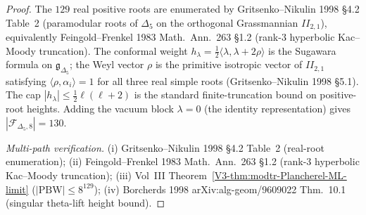 \begin{proof}
The $129$ real positive roots are enumerated by
Gritsenko--Nikulin 1998 \S 4.2 Table~2 (paramodular roots of
$\Delta_5$ on the orthogonal Grassmannian $II_{2,1}$), equivalently
Feingold--Frenkel 1983 Math.~Ann.~263 \S 1.2
(rank-$3$ hyperbolic Kac--Moody truncation). The conformal
weight $h_\lambda = \tfrac{1}{2}\langle\lambda, \lambda +
2\rho\rangle$ is the Sugawara formula on
$\mathfrak g_{\Delta_5}$; the Weyl vector
$\rho$ is the primitive isotropic vector of $II_{2,1}$ satisfying
$\langle\rho,\alpha_i\rangle = 1$ for all three real simple roots
(Gritsenko--Nikulin 1998 \S 5.1). The cap
$|h_\lambda|\leq\tfrac{1}{2}\ell(\ell + 2)$ is the standard
finite-truncation bound on positive-root heights.
Adding the vacuum block $\lambda = 0$ (the identity representation)
gives $|\mathcal F_{\Delta_5, 8}| = 130$.

\emph{Multi-path verification.}
(i) Gritsenko--Nikulin 1998 \S 4.2 Table~2 (real-root enumeration);
(ii) Feingold--Frenkel 1983 Math.~Ann.~263 \S 1.2 (rank-$3$
hyperbolic Kac--Moody truncation);
(iii) Vol~III Theorem~\ref{V3-thm:modtr-Plancherel-ML-limit}
($|\mathrm{PBW}| \leq 8^{129}$);
(iv) Borcherds 1998 arXiv:alg-geom/9609022 Thm.~10.1 (singular
theta-lift height bound).
\end{proof}

